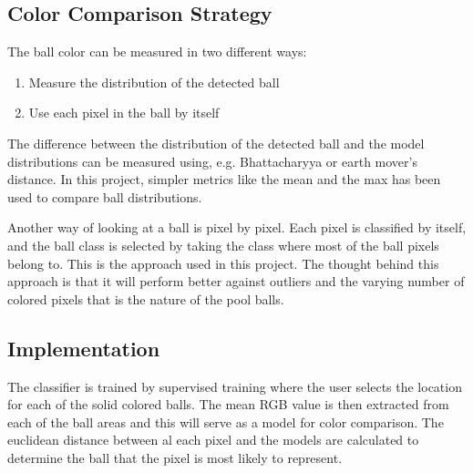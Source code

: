 \subsection{Color Comparison Strategy}

The ball color can be measured in two different ways: 
\begin{enumerate}
  \item Measure the distribution of the detected ball
  \item Use each pixel in the ball by itself
\end{enumerate}

The difference between the distribution of the detected ball and the model distributions can be measured using, e.g. Bhattacharyya or earth mover's distance. In this project, simpler metrics like the mean and the max has been used to compare ball distributions. 

Another way of looking at a ball is pixel by pixel. Each pixel is classified by itself, and the ball class is selected by taking the class where most of the ball pixels belong to. This is the approach used in this project. The thought behind this approach is that it will perform better against outliers and the varying number of colored pixels that is the nature of the pool balls. 

\subsection{Implementation}
The classifier is trained by supervised training where the user selects the location for each of the solid colored balls. The mean RGB value is then extracted from each of the ball areas and this will serve as a model for color comparison. 
The euclidean distance between al each pixel and the models are calculated to determine the ball that the pixel is most likely to represent.

